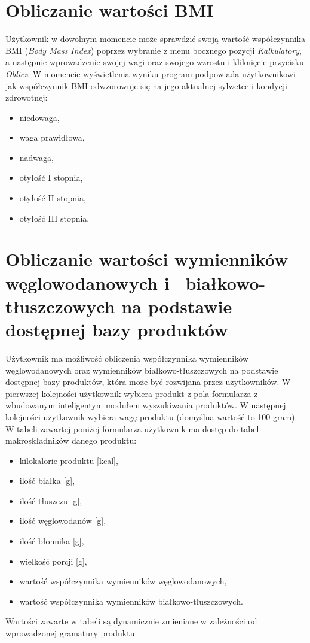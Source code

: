 \section{Obliczanie wartości BMI}
Użytkownik w dowolnym momencie może sprawdzić swoją wartość współczynnika BMI (\textit{Body Mass Index}) poprzez wybranie z menu bocznego pozycji \textit{Kalkulatory}, a następnie wprowadzenie swojej wagi oraz swojego wzrostu i kliknięcie przycisku \textit{Oblicz}. W momencie wyświetlenia wyniku program podpowiada użytkownikowi jak współczynnik BMI odwzorowuje się na jego aktualnej sylwetce i kondycji zdrowotnej:
\begin{itemize}
	\item niedowaga,
	\item waga prawidłowa,
	\item nadwaga,
	\item otyłość I stopnia,
	\item otyłość II stopnia,
	\item otyłość III stopnia.
\end{itemize}

\section{Obliczanie wartości wymienników węglowodanowych i~ białkowo-tłuszczowych na podstawie dostępnej bazy produktów}
Użytkownik ma możliwość obliczenia współczynnika wymienników węglowodanowych oraz wymienników białkowo-tłuszczowych na podstawie dostępnej bazy produktów, która może być rozwijana przez użytkowników. W pierwszej kolejności użytkownik wybiera produkt z pola formularza z~ wbudowanym inteligentym modułem wyszukiwania produktów. W następnej kolejności użytkownik wybiera wagę produktu (domyślna wartość to 100 gram). W tabeli zawartej poniżej formularza użytkownik ma dostęp do tabeli makroskładników danego produktu:
\begin{itemize}
	\item kilokalorie produktu [kcal],
	\item ilość białka [g],
	\item ilość tłuszczu [g],
	\item ilość węglowodanów [g],
	\item ilość błonnika [g],
	\item wielkość porcji [g],
	\item wartość współczynnika wymienników węglowodanowych,
	\item wartość współczynnika wymienników białkowo-tłuszczowych.
\end{itemize}
Wartości zawarte w tabeli są dynamicznie zmieniane w zależności od wprowadzonej gramatury produktu.

